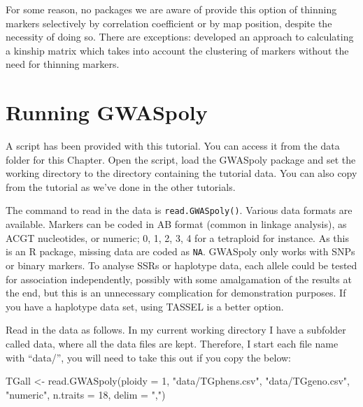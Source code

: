 \documentclass[
]{book}
\makeatletter
\newenvironment{Shaded}{\begin{snugshade}}{\end{snugshade}}
\newcommand{\AttributeTok}[1]{\textcolor[rgb]{0.77,0.63,0.00}{#1}}
\newcommand{\DecValTok}[1]{\textcolor[rgb]{0.00,0.00,0.81}{#1}}
\newcommand{\FunctionTok}[1]{\textcolor[rgb]{0.00,0.00,0.00}{#1}}
\newcommand{\NormalTok}[1]{#1}
\newcommand{\OtherTok}[1]{\textcolor[rgb]{0.56,0.35,0.01}{#1}}
\newcommand{\StringTok}[1]{\textcolor[rgb]{0.31,0.60,0.02}{#1}}
\newenvironment{kframe}{%
\medskip{}
\setlength{\fboxsep}{.8em}
 \def\at@end@of@kframe{}%
 \ifinner\ifhmode%
  \def\at@end@of@kframe{\end{minipage}}%
  \begin{minipage}{\columnwidth}%
 \fi\fi%
 \def\FrameCommand##1{\hskip\@totalleftmargin \hskip-\fboxsep
 \colorbox{shadecolor}{##1}\hskip-\fboxsep
     \hskip-\linewidth \hskip-\@totalleftmargin \hskip\columnwidth}%
 \MakeFramed {\advance\hsize-\width
   \@totalleftmargin\z@ \linewidth\hsize
   \@setminipage}}%
 {\par\unskip\endMakeFramed%
 \at@end@of@kframe}
\newenvironment{rmdblock}[1]
  {
  \begin{itemize}
  \renewcommand{\labelitemi}{
    \raisebox{-.7\height}[0pt][0pt]{
      {\setkeys{Gin}{width=3em,keepaspectratio}\texttt{[image: images/\#1]}}
    }
  }
  \setlength{\fboxsep}{1em}
  \begin{kframe}
  \item
  }
  {
  \end{kframe}
  \end{itemize}
  }
\newenvironment{rmdnote}
  {\begin{rmdblock}{note}}
  {\end{rmdblock}}
\makeatother
\begin{document}
For some reason, no packages we are aware of provide this option of thinning markers selectively by correlation coefficient or by map position, despite the necessity of doing so. There are exceptions: \citet{speed2012} developed an approach to calculating a kinship matrix which takes into account the clustering of markers without the need for thinning markers.

\hypertarget{running-gwaspoly}{%
\section{Running GWASpoly}\label{running-gwaspoly}}

\begin{rmdnote}
A script has been provided with this tutorial. You can access it from the data folder for this Chapter. Open the script, load the GWASpoly package and set the working directory to the directory containing the tutorial data. You can also copy from the tutorial as we've done in the other tutorials.
\end{rmdnote}

The command to read in the data is \texttt{read.GWASpoly()}. Various data formats are available. Markers can be coded in AB format (common in linkage analysis), as ACGT nucleotides, or numeric; 0, 1, 2, 3, 4 for a tetraploid for instance. As this is an R package, missing data are coded as \texttt{NA}. GWASpoly only works with SNPs or binary markers. To analyse SSRs or haplotype data, each allele could be tested for association independently, possibly with some amalgamation of the results at the end, but this is an unnecessary complication for demonstration purposes. If you have a haplotype data set, using TASSEL is a better option.

Read in the data as follows. In my current working directory I have a subfolder called data, where all the data files are kept. Therefore, I start each file name with ``data/'', you will need to take this out if you copy the below:

\begin{Shaded}
\begin{Highlighting}[]
\NormalTok{TGall }\OtherTok{\textless{}{-}} \FunctionTok{read.GWASpoly}\NormalTok{(}\AttributeTok{ploidy =} \DecValTok{1}\NormalTok{, }\StringTok{"data/TGphens.csv"}\NormalTok{, }\StringTok{"data/TGgeno.csv"}\NormalTok{, }
    \StringTok{"numeric"}\NormalTok{, }\AttributeTok{n.traits =} \DecValTok{18}\NormalTok{, }\AttributeTok{delim =} \StringTok{","}\NormalTok{)}
\end{Highlighting}
\end{Shaded}
\end{document}
